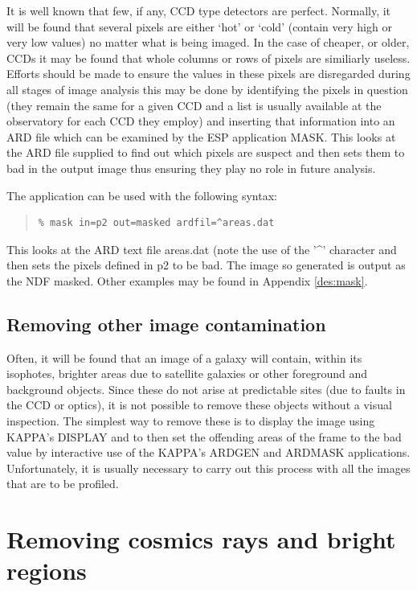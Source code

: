 \documentclass[twoside,11pt]{article}
\newcommand{\xref}[3]{#1}
\newenvironment{myquote}{\begin{quote}\begin{small}}{\end{small}\end{quote}}
\begin{document}
It is well known that few, if any, CCD type detectors are perfect. Normally,
it will be found that several pixels are either `hot' or `cold' (contain very 
high or very low values) no matter what is being imaged. In the case of 
cheaper, or older, CCDs it may be found that whole columns or rows of pixels 
are similiarly useless. Efforts should be made to ensure the values in these
 pixels are disregarded during all stages of image analysis this may
be done by identifying the pixels in question (they remain the same for 
a given CCD and a list is usually available at the observatory for
each CCD they employ) and inserting that information into an ARD file
which can be examined by the ESP application MASK. This looks at the 
ARD file supplied to find out which pixels are suspect and then sets them
to bad in the output image thus ensuring they play no role in future analysis.

The application can be used with the following syntax:

\begin{myquote}
\begin{verbatim}
% mask in=p2 out=masked ardfil=^areas.dat
\end{verbatim}
\end{myquote}

This looks at the ARD text file areas.dat (note the use of the 
'\^{ }' character and then sets the pixels defined 
in p2 to be bad. The image so generated is output as the NDF masked.
Other examples may be found in Appendix \ref{des:mask}.


\subsection{Removing other image contamination}

Often, it will be found that an image of a galaxy will contain, within its 
isophotes, brighter areas due to satellite galaxies or other foreground and 
background objects. Since these do not arise at predictable sites (due to faults
in the CCD or optics), it is not possible to remove 
these objects without a visual inspection. The simplest way to remove these 
is to display the image using \xref{KAPPA}{sun95}{}'s DISPLAY and to then set the offending 
areas of the frame to the bad value 
by interactive use of the \xref{KAPPA}{sun95}{}'s ARDGEN and ARDMASK applications. 
Unfortunately, it is usually necessary to carry out this process with all the 
images that are to be profiled. 

\section{Removing cosmics rays and bright regions}
\label{sec:removc}
\end{document}
